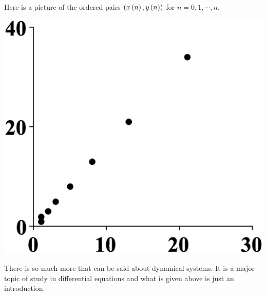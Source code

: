 Here is a picture of
the ordered pairs $\left(x\left(n\right) ,y\left(n\right) \right) $ for $
n=0,1,\cdots ,n$.

\begin{center}
\includegraphics[bb=0 0 800 800,scale=.2]{figures/fibonacci.eps}
\end{center}

There is so much more that can be said about dynamical systems. It is a
major topic of study in differential equations and what is given above is
just an introduction.